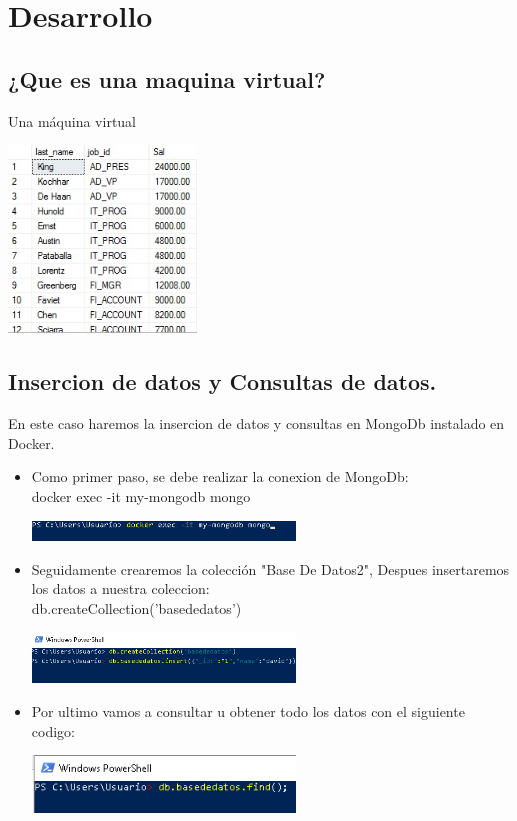 \documentclass[twoside,twocolumn]{article}
\begin{document}
\section{Desarrollo}

\subsection{¿Que es una maquina virtual?}

Una máquina virtual 

\begin{center}
	\includegraphics[width=5cm]{./Imagenes/virtualizacion} 
	\end{center}

\subsection{Insercion de datos y Consultas de datos.}
En este caso haremos la insercion de datos y consultas en MongoDb instalado en Docker.
\begin{itemize}
\item Como primer paso, se debe realizar la conexion de MongoDb:\\
docker exec -it my-mongodb mongo
\begin{center}
	\includegraphics[width=7cm]{./Imagenes/ins1} 
	\end{center}
\item Seguidamente crearemos la colección "Base De Datos2", Despues insertaremos los datos a nuestra coleccion:\\
db.createCollection('basededatos')  
\begin{center}
	\includegraphics[width=7cm]{./Imagenes/ins2} 
	\end{center}

\item Por ultimo vamos a consultar u obtener todo los datos con el siguiente codigo:\\

\begin{center}
	\includegraphics[width=7cm]{./Imagenes/ins3} 
	\end{center}
\end{itemize} 
\end{document}
